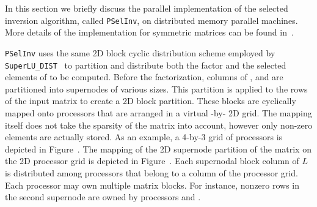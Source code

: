 \documentclass{acm_proc_article-sp}
\newcommand{\Lmat}{\ensuremath{L}\xspace}
\newcommand{\pselinv}{\texttt{PSelInv}\xspace}
\newcommand{\superlu}{\texttt{SuperLU\_DIST}\xspace}
\begin{document}
In this section we briefly discuss the parallel implementation of the
selected inversion algorithm, called \texttt{PSelInv}, on distributed
memory parallel machines.  More details of the implementation for
symmetric matrices can be found in~\cite{JacquelinLinYang2014}.  

\pselinv uses the same 2D block cyclic distribution scheme 
employed by \superlu~\cite{LiDemmel2003} to partition and distribute both
the  factor and the selected elements of  to 
be computed.
Before the factorization, columns of ,  and  are
partitioned into supernodes of various sizes.
This partition is applied to the rows of the input matrix to create
a 2D block partition. These blocks are cyclically mapped onto processors that are 
arranged in a virtual -by- 2D grid.
The mapping itself does not take the sparsity of the matrix into account,
however only non-zero elements are actually stored.
As an example, a 4-by-3 grid of processors is depicted in
Figure~.  
The mapping of the 2D supernode partition of the matrix 
on the 2D processor grid is depicted in Figure~.
Each supernodal block column of \Lmat is distributed among processors
that belong to a column of the processor grid.  Each processor may own
multiple matrix blocks.  For instance, nonzero rows in the second 
supernode are owned by processors  and .
\end{document}
